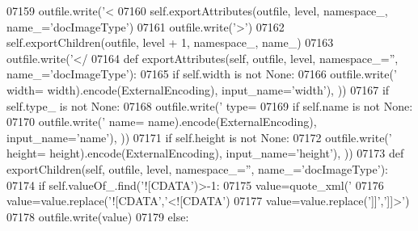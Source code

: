 \begin{DoxyCode}
{{{{{{{{{{{{{{{{{{{{{{{{{{{{{{{{{{{{{{{{{{{{{{{{{{{{{{{{{{{{{{{{{{{{{{{{{{{{{{{{{{{{{{{{{{{{{{{{{{{{{{{{{{{{{{{{{{{{{{{{{{{{{{{{{{{{{{{{{{{{{{{{{{{{{{{{{{{{{{{{{{{{{{{{{{{{{{{{{{{{{{{{{{{{{{{{{{{{{{{{{{{{{{{{{{{{{{{{{{{{{{{{{{{{{{{{{{{{{{{{{{{{{{{{{{{{{{{{{{{{{{{{{{{{{{{{{{{{{{{{{{{{{{{{{{{{{{{{{{{{{{{{{{{{{{{{{{{{{{{{{{{{{{{{{{{{{{{{{{{{{{{{{{{{{{{{{{{{{{{{{{{{{{{{{{{{{{{{{{{{{{{{{{{{{{{{{{{{{{{{{{{{{{{{{{{{{{{{{{{{{{{{{{{{{{{{{{{{{{{{{07159         outfile.write(\textcolor{stringliteral}{'<%
07160         self.exportAttributes(outfile, level, namespace\_, name\_=\textcolor{stringliteral}{'docImageType'})
07161         outfile.write(\textcolor{stringliteral}{'>'})
07162         self.exportChildren(outfile, level + 1, namespace\_, name\_)
07163         outfile.write(\textcolor{stringliteral}{'</%
07164     \textcolor{keyword}{def }exportAttributes(self, outfile, level, namespace\_='', name\_='docImageType'):
07165         \textcolor{keywordflow}{if} self.width \textcolor{keywordflow}{is} \textcolor{keywordflow}{not} \textcolor{keywordtype}{None}:
07166             outfile.write(\textcolor{stringliteral}{' width=%
      width).encode(ExternalEncoding), input\_name=\textcolor{stringliteral}{'width'}), ))
07167         \textcolor{keywordflow}{if} self.type_ \textcolor{keywordflow}{is} \textcolor{keywordflow}{not} \textcolor{keywordtype}{None}:
07168             outfile.write(\textcolor{stringliteral}{' type=%
07169         \textcolor{keywordflow}{if} self.name \textcolor{keywordflow}{is} \textcolor{keywordflow}{not} \textcolor{keywordtype}{None}:
07170             outfile.write(\textcolor{stringliteral}{' name=%
      name).encode(ExternalEncoding), input\_name=\textcolor{stringliteral}{'name'}), ))
07171         \textcolor{keywordflow}{if} self.height \textcolor{keywordflow}{is} \textcolor{keywordflow}{not} \textcolor{keywordtype}{None}:
07172             outfile.write(\textcolor{stringliteral}{' height=%
      height).encode(ExternalEncoding), input\_name=\textcolor{stringliteral}{'height'}), ))
07173     \textcolor{keyword}{def }exportChildren(self, outfile, level, namespace\_='', name\_='docImageType'):
07174         \textcolor{keywordflow}{if} self.valueOf\_.find(\textcolor{stringliteral}{'![CDATA'})>-1:
07175             value=quote_xml(\textcolor{stringliteral}{'%
07176             value=value.replace(\textcolor{stringliteral}{'![CDATA'},\textcolor{stringliteral}{'<![CDATA'})
07177             value=value.replace(\textcolor{stringliteral}{']]'},\textcolor{stringliteral}{']]>'})
07178             outfile.write(value)
07179         \textcolor{keywordflow}{else}:
}}}}}}}}}}}}}}}}}}}}}}}}}}}}}}}}}}}}}}}}}}}}}}}}}}}}}}}}}}}}}}}}}}}}}}}}}}}}}}}}}}}}}}}}}}}}}}}}}}}}}}}}}}}}}}}}}}}}}}}}}}}}}}}}}}}}}}}}}}}}}}}}}}}}}}}}}}}}}}}}}}}}}}}}}}}}}}}}}}}}}}}}}}}}}}}}}}}}}}}}}}}}}}}}}}}}}}}}}}}}}}}}}}}}}}}}}}}}}}}}}}}}}}}}}}}}}}}}}}}}}}}}}}}}}}}}}}}}}}}}}}}}}}}}}}}}}}}}}}}}}}}}}}}}}}}}}}}}}}}}}}}}}}}}}}}}}}}}}}}}}}}}}}}}}}}}}}}}}}}}}}}}}}}}}}}}}}}}}}}}}}}}}}}}}}}}}}}}}}}}}}}}}}}}}}}}}}}}}}}}}}}}}}}}}}}}}}}}}}}}}}}}}}}}
\end{DoxyCode}
